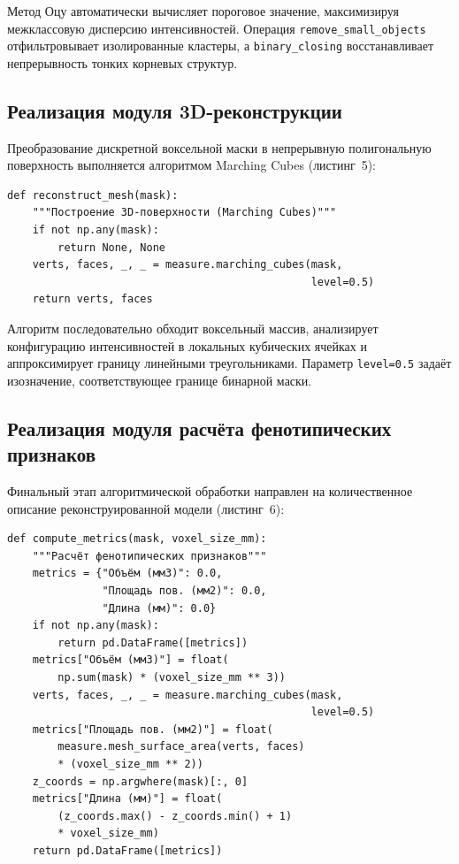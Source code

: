 \documentclass[14pt,a4paper]{extreport}
\begin{document}
Метод Оцу автоматически вычисляет пороговое значение, максимизируя межклассовую дисперсию интенсивностей. Операция \texttt{remove\_small\_objects} отфильтровывает изолированные кластеры, а \texttt{binary\_closing} восстанавливает непрерывность тонких корневых структур.

\subsection{Реализация модуля 3D-реконструкции}

Преобразование дискретной воксельной маски в непрерывную полигональную поверхность выполняется алгоритмом Marching Cubes (листинг~5):

\begin{lstlisting}[caption={Генерация полигональной сетки методом Marching Cubes}]
def reconstruct_mesh(mask):
    """Построение 3D-поверхности (Marching Cubes)"""
    if not np.any(mask):
        return None, None
    verts, faces, _, _ = measure.marching_cubes(mask,
                                                level=0.5)
    return verts, faces
\end{lstlisting}

Алгоритм последовательно обходит воксельный массив, анализирует конфигурацию интенсивностей в локальных кубических ячейках и аппроксимирует границу линейными треугольниками. Параметр \texttt{level=0.5} задаёт изозначение, соответствующее границе бинарной маски.

\subsection{Реализация модуля расчёта фенотипических признаков}

Финальный этап алгоритмической обработки направлен на количественное описание реконструированной модели (листинг~6):

\begin{lstlisting}[caption={Функция расчёта фенотипических признаков}]
def compute_metrics(mask, voxel_size_mm):
    """Расчёт фенотипических признаков"""
    metrics = {"Объём (мм3)": 0.0,
               "Площадь пов. (мм2)": 0.0,
               "Длина (мм)": 0.0}
    if not np.any(mask):
        return pd.DataFrame([metrics])
    metrics["Объём (мм3)"] = float(
        np.sum(mask) * (voxel_size_mm ** 3))
    verts, faces, _, _ = measure.marching_cubes(mask,
                                                level=0.5)
    metrics["Площадь пов. (мм2)"] = float(
        measure.mesh_surface_area(verts, faces)
        * (voxel_size_mm ** 2))
    z_coords = np.argwhere(mask)[:, 0]
    metrics["Длина (мм)"] = float(
        (z_coords.max() - z_coords.min() + 1)
        * voxel_size_mm)
    return pd.DataFrame([metrics])
\end{lstlisting}
\end{document}
